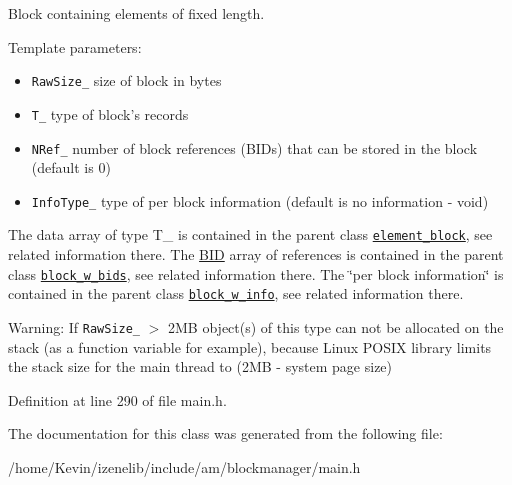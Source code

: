 Block containing elements of fixed length. 

Template parameters:\begin{itemize}
\item {\tt RawSize\_\-} size of block in bytes\item {\tt T\_\-} type of block's records\item {\tt NRef\_\-} number of block references (BIDs) that can be stored in the block (default is 0)\item {\tt InfoType\_\-} type of per block information (default is no information - void)\end{itemize}


The data array of type T\_\- is contained in the parent class {\tt \hyperlink{classelement__block}{element\_\-block}}, see related information there. The \hyperlink{structBID}{BID} array of references is contained in the parent class {\tt \hyperlink{classblock__w__bids}{block\_\-w\_\-bids}}, see related information there. The \char`\"{}per block information\char`\"{} is contained in the parent class {\tt \hyperlink{classblock__w__info}{block\_\-w\_\-info}}, see related information there. \begin{Desc}
\item[Warning:]If {\tt RawSize\_\-} $>$ 2MB object(s) of this type can not be allocated on the stack (as a function variable for example), because Linux POSIX library limits the stack size for the main thread to (2MB - system page size) \end{Desc}


Definition at line 290 of file main.h.

The documentation for this class was generated from the following file:\begin{CompactItemize}
\item 
/home/Kevin/izenelib/include/am/blockmanager/main.h\end{CompactItemize}
